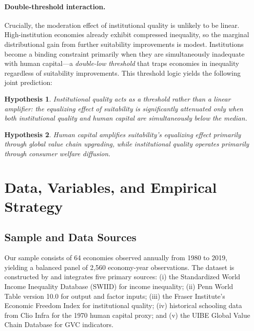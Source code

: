 \documentclass[12pt]{article}
\newtheorem{hypothesis}{Hypothesis}
\begin{document}
\paragraph{Double-threshold interaction.}
Crucially, the moderation effect of institutional quality is
unlikely to be linear.
High-institution economies already exhibit compressed inequality,
so the marginal distributional gain from further suitability
improvements is modest.
Institutions become a binding constraint primarily when they
are simultaneously inadequate with human capital---a
\emph{double-low threshold} that traps economies in inequality
regardless of suitability improvements.
This threshold logic yields the following joint prediction:

\begin{hypothesis}
Institutional quality acts as a threshold rather than a linear
amplifier: the equalizing effect of suitability is significantly
attenuated only when both institutional quality and human capital
are simultaneously below the median.
\end{hypothesis}

\begin{hypothesis}
Human capital amplifies suitability's equalizing effect primarily
through global value chain upgrading, while institutional quality
operates primarily through consumer welfare diffusion.
\end{hypothesis}

\section{Data, Variables, and Empirical Strategy}
\label{sec:data}

\subsection{Sample and Data Sources}

Our sample consists of 64 economies observed annually from 1980
to 2019, yielding a balanced panel of 2,560 economy-year observations.
The dataset is constructed by \citet{li2026prosperity} and integrates
five primary sources:
(i) the Standardized World Income Inequality Database (SWIID)
\citep{solt2016standardizing} for income inequality;
(ii) Penn World Table version 10.0 \citep{feenstra2015next} for
output and factor inputs;
(iii) the Fraser Institute's Economic Freedom Index
\citep{gwartney2020economic} for institutional quality;
(iv) historical schooling data from Clio Infra for the 1970 human
capital proxy; and
(v) the UIBE Global Value Chain Database for GVC indicators.
\end{document}
